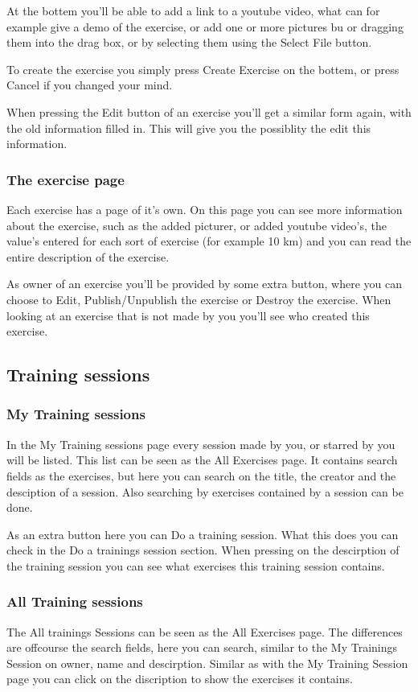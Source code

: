 \documentclass[11pt,a4paper]{scrartcl}
\begin{document}
At the bottem you'll be able to add a link to a youtube video, what can for example give a demo of the exercise, or add one or more
pictures bu or dragging them into the drag box, or by selecting them using the Select File button. 

To create the exercise you simply press Create Exercise on the bottem, or press Cancel if you changed your mind.

When pressing the Edit button of an exercise you'll get a similar form again, with the old information filled in. This will give you the
possiblity the edit this information.

\subsubsection{The exercise page}
Each exercise has a page of it's own. On this page you can see more information about the exercise, such as the added picturer, or 
added youtube video's, the value's entered for each sort of exercise (for example 10 km) and you can read the entire description 
of the exercise.

As owner of an exercise you'll be provided by some extra button, where you can choose to Edit, Publish/Unpublish the exercise or Destroy
the exercise. When looking at an exercise that is not made by you you'll see who created this exercise.

\subsection{Training sessions}
\subsubsection{My Training sessions}
In the My Training sessions page every session made by you, or starred by you will be listed. This list can be seen as the All
Exercises page. It contains search fields as the exercises, but here you can search on the title, the creator and the desciption of a session.
Also searching by exercises contained by a session can be done.

As an extra button here you can Do a training session. What this does you can check in the Do a trainings session section.
When pressing on the descirption of the training session you can see what exercises this training session contains.
\subsubsection{All Training sessions}
The All trainings Sessions can be seen as the All Exercises page. The differences are offcourse the search fields, here you can search,
similar to the My Trainings Session on owner, name and descirption. Similar as with the My Training Session page you can click on the 
discription to show the exercises it contains. 
\end{document}
